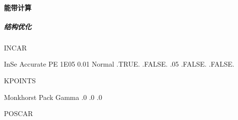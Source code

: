 \documentclass[a4paper,12pt,english]{sphinxmanual}
\begin{document}
\paragraph{能带计算}
\label{\detokenize{tutorials/vasp/mobility:id5}}

\subparagraph{结构优化}
\label{\detokenize{tutorials/vasp/mobility:id6}}
\begin{DUlineblock}{0em}
\item[] INCAR
\end{DUlineblock}

\begin{sphinxVerbatim}[commandchars=\\\{\}]
  InSe
  
  
    Accurate
   
     PE
     
    
    
  
    
   1E\PYGZhy{}05
  \PYGZhy{}0.01
    Normal
   .TRUE.
   .FALSE.
  
   .05
  
    .FALSE.
  .FALSE.
    
\end{sphinxVerbatim}

\begin{DUlineblock}{0em}
\item[] KPOINTS
\end{DUlineblock}

\begin{sphinxVerbatim}[commandchars=\\\{\}]
Monkhorst Pack
Gamma
       
.0   .0   .0
\end{sphinxVerbatim}

\begin{DUlineblock}{0em}
\item[] POSCAR
\end{DUlineblock}
\end{document}
